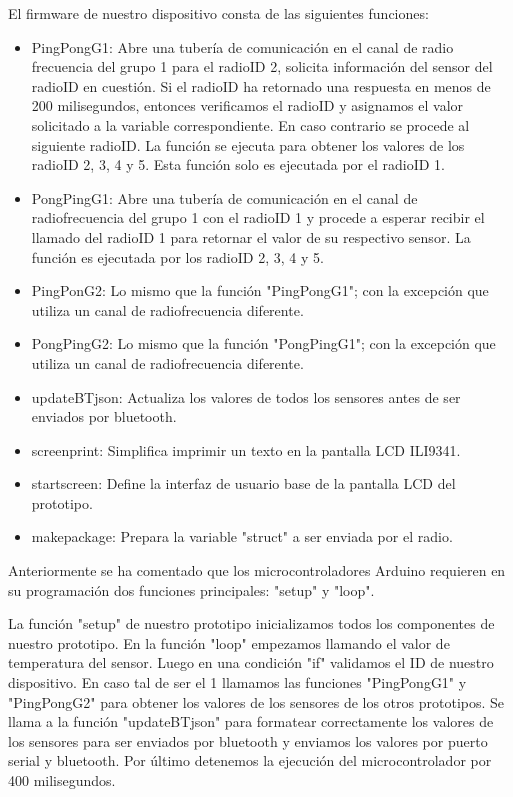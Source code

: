\par \noindent
El firmware de nuestro dispositivo consta de las siguientes funciones:
\begin{itemize}
	\item PingPongG1: Abre una tubería de comunicación en el canal de radio frecuencia del grupo 1 para el radioID 2, solicita información del sensor del radioID en cuestión. Si el radioID ha retornado una respuesta en menos de 200 milisegundos, entonces verificamos el radioID y asignamos el valor solicitado a la variable correspondiente. En caso contrario se procede al siguiente radioID. La función se ejecuta para obtener los valores de los radioID 2, 3, 4 y 5. Esta función solo es ejecutada por el radioID 1.
	
	\item PongPingG1: Abre una tubería de comunicación en el canal de radiofrecuencia del grupo 1 con el radioID 1 y procede a esperar recibir el llamado del radioID 1 para retornar el valor de su respectivo sensor. La función es ejecutada por los radioID 2, 3, 4 y 5.
	
	\item PingPonG2: Lo mismo que la función "PingPongG1"; con la excepción que utiliza un canal de radiofrecuencia diferente.
	
	\item PongPingG2: Lo mismo que la función "PongPingG1"; con la excepción que utiliza un canal de radiofrecuencia diferente.
	
	\item updateBTjson: Actualiza los valores de todos los sensores antes de ser enviados por bluetooth.
	
	\item screenprint: Simplifica imprimir un texto en la pantalla LCD ILI9341.
	
	\item startscreen: Define la interfaz de usuario base de la pantalla LCD del prototipo.
	
	\item makepackage: Prepara la variable "struct" a ser enviada por el radio.
\end{itemize}

\par \noindent
Anteriormente se ha comentado que los microcontroladores Arduino requieren en su programación dos funciones principales: "setup" y "loop". 

\par \noindent
La función "setup" de nuestro prototipo inicializamos todos los componentes de nuestro prototipo. En la función "loop" empezamos llamando el valor de temperatura del sensor. Luego en una condición "if" validamos el ID de nuestro dispositivo. En caso tal de ser el 1 llamamos las funciones "PingPongG1" y "PingPongG2" para obtener los valores de los sensores de los otros prototipos. Se llama a la función "updateBTjson" para formatear correctamente los valores de los sensores para ser enviados por bluetooth y enviamos los valores por puerto serial y bluetooth. Por último detenemos la ejecución del microcontrolador por 400 milisegundos.

